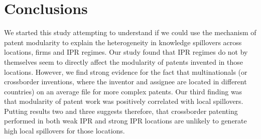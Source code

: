\documentclass[12pt]{article}
\begin{document}
\section{Conclusions}
We started this study attempting to understand if we could use the mechanism of patent modularity to explain the heterogeneity in knowledge spillovers across locations, firms and IPR regimes. Our study found that IPR regimes do not by themselves seem to directly affect the modularity of patents invented in those locations. However, we find strong evidence for the fact that multinationals (or crossborder inventions, where the inventor and assignee are located in different countries) on an average file for more complex patents. Our third finding was that modularity of patent work was positively correlated with local spillovers. Putting results two and three suggests therefore, that crossborder patenting performed in both weak IPR and strong IPR locations are unlikely to generate high local spillovers for those locations. 

\appendix
\end{document}
